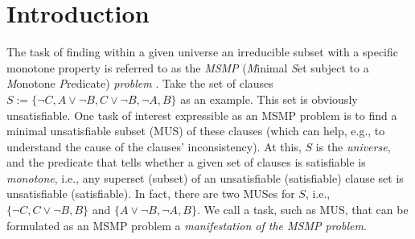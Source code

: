 \documentclass[]{elsarticle}
\begin{document}
	
	\section{Introduction}
	
	The task of finding within a given universe an irreducible subset with a specific monotone property
	is referred to as the \emph{MSMP} (\emph{M}inimal \emph{S}et subject to a \emph{M}onotone \emph{P}redicate) \emph{problem} \cite{bradley2007checking,marques2013minimal}. Take the set of clauses $S:=\{\lnot C, A\lor \lnot B, C\lor \lnot B, \lnot A, B \}$ as an example. This set is obviously unsatisfiable. 
	One task of interest expressible as an MSMP problem is to find a minimal unsatisfiable subset (MUS) of these clauses (which can help, e.g., to understand the cause of the clauses' inconsistency). 
	At this, $S$ is the \emph{universe}, and the predicate that tells whether 
	a given set of clauses
	is satisfiable is \emph{monotone}, i.e., any superset (subset) of an unsatisfiable (satisfiable) clause set is unsatisfiable (satisfiable). In fact, there are two MUSes for $S$, i.e.,  $\{\lnot C, C\lor \lnot B, B\}$ and $\{A\lor \lnot B, \lnot A, B\}$. We call a task, such as MUS, that can be formulated as an MSMP problem a \emph{manifestation of the MSMP problem}. 
	
\end{document}
